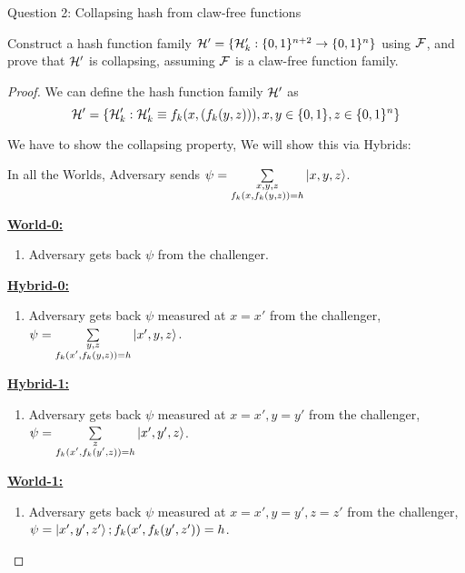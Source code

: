 \begin{solution}{Question 2: Collapsing hash from claw-free functions}\label{ques:x}
    \begin{question}
    Construct a hash function family $ \mathcal{H}' = \{\mathcal{H}'_k : \{0,1\}^{n+2} \rightarrow \{0,1\}^n \} $ using $\mathcal{F}$, and prove that $\mathcal{H}'$ is collapsing, assuming $\mathcal{F}$ is a claw-free function family.

    \end{question}
    \tcblower{}
    \begin{proof}
    We can define the hash function family $\mathcal{H}'$ as 
    \[\mathcal{H}' = \{\mathcal{H}'_k : \mathcal{H}'_k \equiv f_k(x,(f_k(y,z))), x,y \in \{0,1\}, z \in \{0,1\}^n \}\]

    We have to show the collapsing property, We will show this via Hybrids:\newline

    In all the Worlds, Adversary sends $\psi = \sum\limits_{\substack{x,y,z\\ f_k(x,f_k(y,z)) = h}} \ket{x,y,z}$.
    
    \textbf{\underline{World-0:}}

    \begin{enumerate}
        \item Adversary gets back $\psi$ from the challenger.
    \end{enumerate}

    \textbf{\underline{Hybrid-0:}}

    \begin{enumerate}
        \item Adversary gets back $\psi$ measured at $x=x'$ from the challenger, \newline $\psi =\sum\limits_{\substack{y,z\\ f_k(x',f_k(y,z)) = h}} \ket{x',y,z}$.
    \end{enumerate}

    \textbf{\underline{Hybrid-1:}}

    \begin{enumerate}
        \item Adversary gets back $\psi$ measured at $x=x',y=y'$ from the challenger, \newline $\psi =\sum\limits_{\substack{z\\ f_k(x',f_k(y',z)) = h}} \ket{x',y',z}$.
    \end{enumerate}

    \textbf{\underline{World-1:}}

    \begin{enumerate}
        \item Adversary gets back $\psi$ measured at $x=x',y=y', z=z'$ from the challenger, \newline $\psi = \ket{x',y',z'}; f_k(x',f_k(y',z')) = h$.
    \end{enumerate}


\end{proof}
\end{solution}
